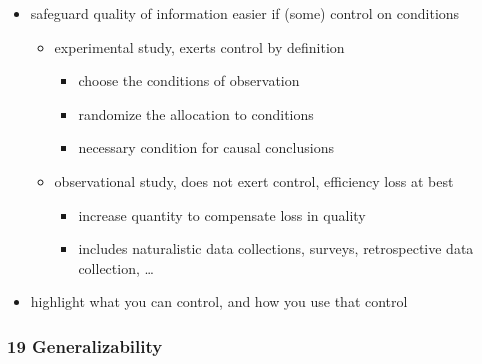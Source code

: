 \documentclass[
]{article}
\providecommand{\tightlist}{%
  \setlength{\itemsep}{0pt}\setlength{\parskip}{0pt}}
\begin{document}
\begin{itemize}
\tightlist
\item
  safeguard quality of information easier if (some) control on
  conditions

  \begin{itemize}
  \tightlist
  \item
    experimental study, exerts control by definition

    \begin{itemize}
    \tightlist
    \item
      choose the conditions of observation
    \item
      randomize the allocation to conditions
    \item
      necessary condition for causal conclusions
    \end{itemize}
  \item
    observational study, does not exert control, efficiency loss at best

    \begin{itemize}
    \tightlist
    \item
      increase quantity to compensate loss in quality
    \item
      includes naturalistic data collections, surveys, retrospective
      data collection, \ldots{} \\
    \end{itemize}
  \end{itemize}
\item
  highlight what you can control, and how you use that control
\end{itemize}

\hypertarget{generalizability}{%
\subsubsection{19 Generalizability}\label{generalizability}}
\end{document}
